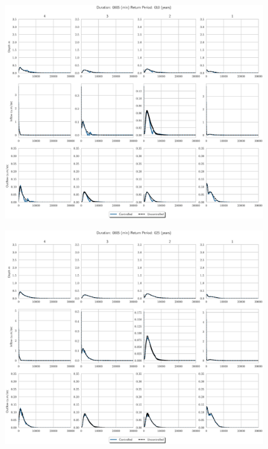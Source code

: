 \begin{figure}
    \centering
    \includegraphics[width=\linewidth]{./RL-SI-figures/77storms/0005010.eps}
\end{figure}
\begin{figure}
    \centering
    \includegraphics[width=\linewidth]{./RL-SI-figures/77storms/0005025.eps}
\end{figure}
